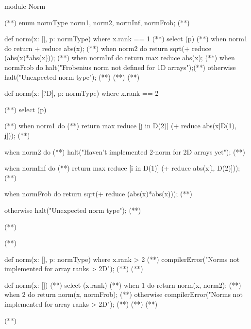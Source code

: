 \begin{numberedchapel}
module Norm{                                    (*\label{norm_start}*)
  enum normType {norm1, norm2, normInf, normFrob}; (*\label{norm_enum}*)

  def norm(x: [], p: normType) where x.rank == 1 { (*\label{vec_start}*)
    select (p) {                                   (*\label{vec_select_start}*)
      when norm1 do return + reduce abs(x);        (*\label{vec_norm1}*)
      when norm2 do return sqrt(+ reduce (abs(x)*abs(x)));  (*\label{vec_norm2}*)
      when normInf do return max reduce abs(x);  (*\label{vec_normInf}*)
      when normFrob do halt("Frobenius norm not defined for 1D arrays");(*\label{vec_normFrob}*)
      otherwise halt("Unexpected norm type"); (*\label{vec_unexp}*)
    } (*\label{vec_select_end}*)
  } (*\label{vec_end}*)

  def norm(x: [?D], p: normType) where x.rank == 2 { (*\label{mat_start}*)
    select (p) {                                     (*\label{mat_select_start}*)
      when norm1 do                                  (*\label{mat_norm1_1}*)
        return max reduce [j in D(2)] (+ reduce abs(x[D(1), j])); (*\label{mat_norm1_2}*)

      when norm2 do  (*\label{mat_norm2_1}*)
        halt("Haven't implemented 2-norm for 2D arrays yet"); (*\label{mat_norm2_2}*)

      when normInf do  (*\label{mat_normInf_1}*)
        return max reduce [i in D(1)] (+ reduce abs(x[i, D(2)])); (*\label{mat_normInf_2}*)

      when normFrob do return sqrt(+ reduce (abs(x)*abs(x))); (*\label{mat_normFrob}*)

      otherwise halt("Unexpected norm type"); (*\label{mat_unexp}*)
    } (*\label{mat_select_end}*)
  } (*\label{mat_end}*)

  def norm(x: [], p: normType) where x.rank > 2 { (*\label{large_rank_start}*)
    compilerError("Norms not implemented for array ranks > 2D"); (*\label{comp_err_1}*)
  } (*\label{large_rank_end}*)

  def norm(x: []) { (*\label{norm_default_start}*)
    select (x.rank) { (*\label{default_select_start}*)
      when 1 do return norm(x, norm2);  (*\label{default_vec}*)
      when 2 do return norm(x, normFrob); (*\label{default_mat}*)
      otherwise compilerError("Norms not implemented for array ranks > 2D"); (*\label{comp_err_2}*)
    }   (*\label{default_select_end}*)
  }  (*\label{norm_default_end}*)
} (*\label{norm_end}*)


\end{numberedchapel}
